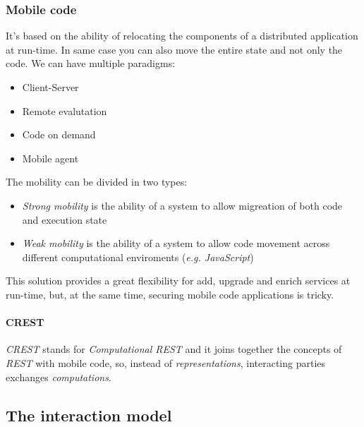 \documentclass{article}
\begin{document}
    \subsubsection{Mobile code}
    It's based on the ability of relocating the components of a distributed application at run-time.
    In same case you can also move the entire state and not only the code.
    We can have multiple paradigms:
    \begin{itemize}
        \item Client-Server
        \item Remote evalutation
        \item Code on demand
        \item Mobile agent
    \end{itemize}
    The mobility can be divided in two types:
    \begin{itemize}
        \item \textit{Strong mobility} is the ability of a system to allow migreation of both code and
            execution state
        \item \textit{Weak mobility} is the ability of a system to allow code movement across different
            computational enviroments (\textit{e.g. JavaScript})
    \end{itemize}
    This solution provides a great flexibility for add, upgrade and enrich services at run-time, but, 
    at the same time, securing mobile code applications is tricky.
    
    \paragraph{CREST}
    \textit{CREST} stands for \textit{Computational REST} and it joins together the concepts of \textit{REST}
    with mobile code, so, instead of \textit{representations}, interacting parties exchanges \textit{computations}.

    \subsection{The interaction model}
\end{document}
